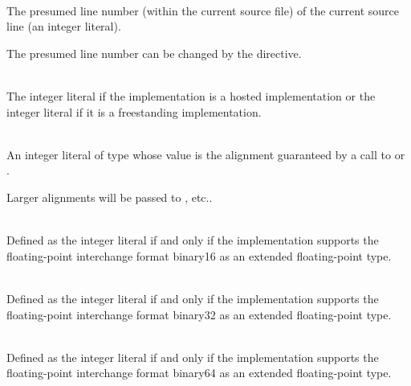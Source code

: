 \begin{description}
\item
{}%
\\
The presumed line number (within the current source file) of the current source line
(an integer literal).
\begin{footnote}
The presumed line number can be changed by the  directive.
\end{footnote}

\item
{}%
%
%
\\
The integer literal 
if the implementation is a hosted implementation or
the integer literal 
if it is a freestanding implementation.

\item
{}%
\\
An integer literal of type 
whose value is the alignment guaranteed
by a call to 
or .
\begin{note}
Larger alignments will be passed to
, etc..
\end{note}

\item
{}%
\\
Defined as the integer literal 
if and only if the implementation supports
the \IsoFloatUndated{} floating-point interchange format binary16
as an extended floating-point type.

\item
{}%
\\
Defined as the integer literal 
if and only if the implementation supports
the \IsoFloatUndated{} floating-point interchange format binary32
as an extended floating-point type.

\item
{}%
\\
Defined as the integer literal 
if and only if the implementation supports
the \IsoFloatUndated{} floating-point interchange format binary64
as an extended floating-point type.


\end{description}
